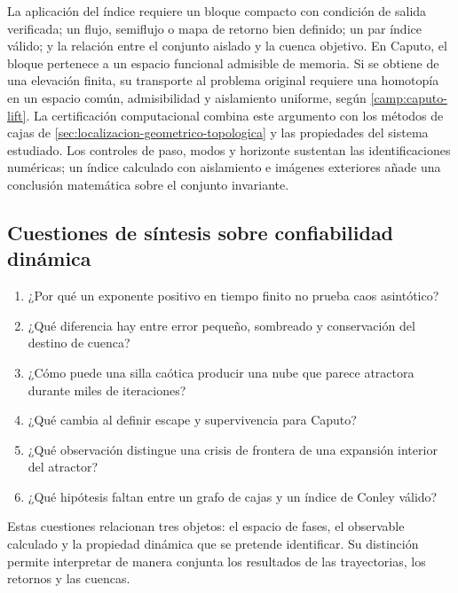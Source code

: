 La aplicación del índice requiere un bloque compacto con condición de
salida verificada; un flujo, semiflujo o mapa de retorno bien definido; un par
índice válido; y la relación entre el conjunto aislado y la cuenca objetivo.
En Caputo, el bloque pertenece a un espacio funcional admisible de memoria.
Si se obtiene de una elevación finita, su transporte al problema original
requiere una homotopía en un espacio común, admisibilidad y aislamiento
uniforme, según \cref{camp:caputo-lift}. La certificación computacional
combina este argumento con los métodos de cajas de
\cref{sec:localizacion-geometrico-topologica} y las propiedades del sistema
estudiado. Los controles de paso, modos y horizonte sustentan las
identificaciones numéricas; un índice calculado con aislamiento e imágenes
exteriores añade una conclusión matemática sobre el conjunto invariante.

\ifHAFOPedagogy
\subsection{Cuestiones de síntesis sobre confiabilidad dinámica}

\begin{enumerate}
 \item ¿Por qué un exponente positivo en tiempo finito no prueba caos
 asintótico?
 \item ¿Qué diferencia hay entre error pequeño, sombreado y conservación del
 destino de cuenca?
 \item ¿Cómo puede una silla caótica producir una nube que parece atractora
 durante miles de iteraciones?
 \item ¿Qué cambia al definir escape y supervivencia para Caputo?
 \item ¿Qué observación distingue una crisis de frontera de una expansión
 interior del atractor?
 \item ¿Qué hipótesis faltan entre un grafo de cajas y un índice de Conley
 válido?
\end{enumerate}

Estas cuestiones relacionan tres objetos: el espacio de fases, el observable
calculado y la propiedad dinámica que se pretende identificar. Su distinción
permite interpretar de manera conjunta los resultados de las trayectorias,
los retornos y las cuencas.
\fi
